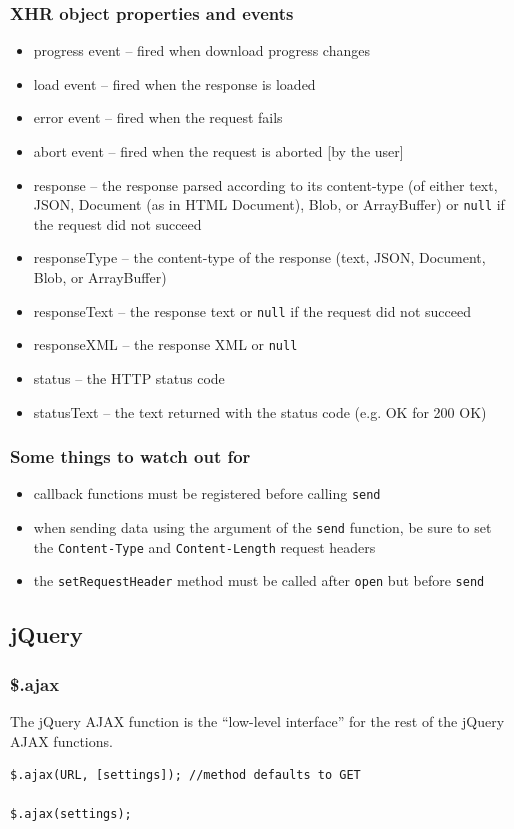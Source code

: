 \documentclass[12pt]{article}
\begin{document}
\subsubsection*{XHR object properties and events}
\begin{itemize}
\item progress event -- fired when download progress changes
\item load event -- fired when the response is loaded
\item error event -- fired when the request fails
\item abort event -- fired when the request is aborted [by the user]
\\
\item response -- the response parsed according to its content-type (of either text, JSON, Document (as in HTML Document), Blob, or ArrayBuffer) or \texttt{null} if the request did not succeed
\item responseType -- the content-type of the response (text, JSON, Document, Blob, or ArrayBuffer)
\item responseText -- the response text or \texttt{null} if the request did not succeed
\item responseXML -- the response XML or \texttt{null}
\item status -- the HTTP status code
\item statusText -- the text returned with the status code (e.g. OK for 200 OK)
\end{itemize}

\subsubsection*{Some things to watch out for}
\begin{itemize}
\item callback functions must be registered before calling \texttt{send}
\item when sending data using the argument of the \texttt{send} function, be sure to set the \texttt{Content-Type} and \texttt{Content-Length} request headers
\item the \texttt{setRequestHeader} method must be called after \texttt{open} but before \texttt{send}
\end{itemize}

\subsection{jQuery}
\subsubsection*{\$.ajax}
The jQuery AJAX function is the ``low-level interface'' for the rest of the jQuery AJAX functions.
\begin{Verbatim}[frame=single]
$.ajax(URL, [settings]); //method defaults to GET

$.ajax(settings);
\end{Verbatim}
\end{document}
